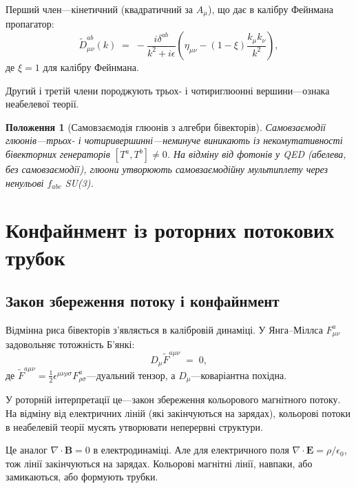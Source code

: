\documentclass[11pt,a4paper]{article}
\theoremstyle{definition}
\theoremstyle{plain}
\newtheorem{proposition}{Положення}[section]
\theoremstyle{remark}
\begin{document}
Перший член—кінетичний (квадратичний за $A_\mu$), що дає в калібру Фейнмана пропагатор:
\begin{equation}
\tilde{D}_{\mu\nu}^{ab}(k) \;=\; -\frac{i\delta^{ab}}{k^2 + i\epsilon}\left(\eta_{\mu\nu} - (1-\xi)\frac{k_\mu k_\nu}{k^2}\right),
\end{equation}
де $\xi=1$ для калібру Фейнмана.

Другий і третій члени породжують трьох- і чотириглюонні вершини—ознака неабелевої теорії.

\begin{proposition}[Самовзаємодія глюонів з алгебри бівекторів]
Самовзаємодії глюонів—трьох- і чотиривершинні—неминуче виникають із некомутативності бівекторних генераторів $[T^a,T^b]\neq 0$. На відміну від фотонів у QED (абелева, без самовзаємодії), глюони утворюють самовзаємодійну мультиплету через ненульові $f_{abc}$ SU(3).
\end{proposition}

\vspace{1em}

\section{Конфайнмент із роторних потокових трубок}
\label{sec:confinement}

\subsection{Закон збереження потоку і конфайнмент}

Відмінна риса бівекторів з’являється в калібровій динаміці. У Янга–Міллса $F_{\mu\nu}^a$ задовольняє тотожність Б’янкі:
\begin{equation}
D_\mu \tilde{F}^{a\mu\nu} \;=\; 0,
\label{eq:bianchi-identity}
\end{equation}
де $\tilde{F}^{a\mu\nu}=\frac{1}{2}\epsilon^{\mu\nu\rho\sigma}F_{\rho\sigma}^a$—дуальний тензор, а $D_\mu$—коваріантна похідна.

У роторній інтерпретації це—закон збереження кольорового магнітного потоку. На відміну від електричних ліній (які закінчуються на зарядах), кольорові потоки в неабелевій теорії мусять утворювати неперервні структури.

Це аналог $\nabla\cdot\mathbf{B}=0$ в електродинаміці. Але для електричного поля $\nabla\cdot\mathbf{E}=\rho/\epsilon_0$, тож лінії закінчуються на зарядах. Кольорові магнітні лінії, навпаки, або замикаються, або формують трубки.
\end{document}
